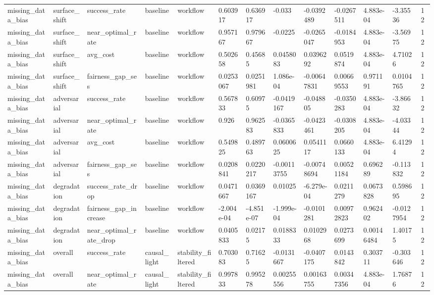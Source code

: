 \begin{tabular}{lllllllllllll}
missing\_data\_bias & surface\_shift & success\_rate & baseline & workflow & 0.603917 & 0.636917 & -0.033 & -0.0392489 & -0.0267511 & 4.883e-04 & -3.35536 & 12 \\
missing\_data\_bias & surface\_shift & near\_optimal\_rate & baseline & workflow & 0.957167 & 0.979667 & -0.0225 & -0.0265047 & -0.0184953 & 4.883e-04 & -3.56975 & 12 \\
missing\_data\_bias & surface\_shift & avg\_cost & baseline & workflow & 0.502658 & 0.45685 & 0.0458083 & 0.0396292 & 0.0519874 & 4.883e-04 & 4.71026 & 12 \\
missing\_data\_bias & surface\_shift & fairness\_gap\_ses & baseline & workflow & 0.0253067 & 0.0251981 & 1.086e-04 & -0.00647831 & 0.00669553 & 0.971191 & 0.0104765 & 12 \\
missing\_data\_bias & adversarial & success\_rate & baseline & workflow & 0.567833 & 0.60975 & -0.0419167 & -0.048805 & -0.0350283 & 4.883e-04 & -3.86632 & 12 \\
missing\_data\_bias & adversarial & near\_optimal\_rate & baseline & workflow & 0.926 & 0.962583 & -0.0365833 & -0.0423461 & -0.0308205 & 4.883e-04 & -4.03344 & 12 \\
missing\_data\_bias & adversarial & avg\_cost & baseline & workflow & 0.549825 & 0.489763 & 0.0600625 & 0.0541117 & 0.0660133 & 4.883e-04 & 6.41294 & 12 \\
missing\_data\_bias & adversarial & fairness\_gap\_ses & baseline & workflow & 0.0208841 & 0.0220217 & -0.00113755 & -0.00748694 & 0.00521184 & 0.696289 & -0.113832 & 12 \\
missing\_data\_bias & degradation & success\_rate\_drop & baseline & workflow & 0.0471667 & 0.0369167 & 0.01025 & -6.279e-04 & 0.0211279 & 0.0673828 & 0.598695 & 12 \\
missing\_data\_bias & degradation & fairness\_gap\_increase & baseline & workflow & -2.004e-04 & -4.851e-07 & -1.999e-04 & -0.0101281 & 0.00972823 & 0.962402 & -0.0127954 & 12 \\
missing\_data\_bias & degradation & near\_optimal\_rate\_drop & baseline & workflow & 0.0405833 & 0.02175 & 0.0188333 & 0.0102968 & 0.0273699 & 0.00146484 & 1.40175 & 12 \\
missing\_data\_bias & overall & success\_rate & causal\_light & stability\_filtered & 0.703083 & 0.71625 & -0.0131667 & -0.0407175 & 0.0143842 & 0.303711 & -0.303646 & 12 \\
missing\_data\_bias & overall & near\_optimal\_rate & causal\_light & stability\_filtered & 0.997833 & 0.995278 & 0.00255556 & 0.00163755 & 0.00347356 & 4.883e-04 & 1.76876 & 12 \\

\end{tabular}
